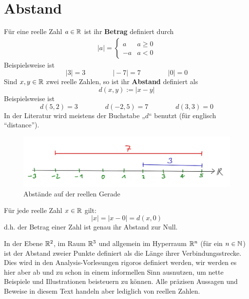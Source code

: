 \section{Abstand}

\begin{de} \label{abstand}
Für eine reelle Zahl $a\in {\mathbb R}$ ist ihr \textbf{Betrag} definiert durch 
	\begin{align*}
		|a|=\begin{cases}
			a&a\geq 0\\
			-a&a<0
		\end{cases}
	\end{align*}
Beispielsweise ist
\[ \vert 3\vert = 3 \qquad\qquad \vert -7\vert =7 \qquad\qquad \vert 0\vert=0 \]
Sind $x,y\in {\mathbb R}$ zwei reelle Zahlen, so ist ihr \textbf{Abstand} definiert als
 \[ d(x,y) := \vert x -y\vert \]
 Beispielsweise ist
 \[ d(5,2)= 3 \qquad\qquad d(-2,5)=7 \qquad\qquad d(3,3)=0 \]
In der Literatur wird meistens der Buchstabe „$d$“ benutzt (für englisch ``distance'').
    \begin{figure}[H]
\begin{center}
\includegraphics[width=12cm]{./_img/Abstand.jpeg}
\end{center}
\centering \caption{Abstände auf der reellen Gerade}
\end{figure}
\end{de}


\begin{bem}
Für jede reelle Zahl $x\in {\mathbb R}$ gilt:
 \[ \vert x\vert = \vert x-0\vert = d(x,0) \]
 d.h. der Betrag einer Zahl ist genau ihr Abstand zur Null.
\end{bem}



\begin{bem}
 In der Ebene ${\mathbb R}^2$, im Raum ${\mathbb R}^3$ und allgemein im Hyperraum ${\mathbb R}^n$ (für ein $n\in {\mathbb N}$) ist der Abstand zweier Punkte definiert als die Länge ihrer Verbindungsstrecke. Dies wird in den Analysis-Vorlesungen rigoros definiert werden, wir werden es hier aber ab und zu schon in einem informellen Sinn ausnutzen, um nette Beispiele und Illustrationen beisteuern zu können. Alle präzisen Aussagen und Beweise in diesem Text handeln aber lediglich von reellen Zahlen.
\end{bem}





